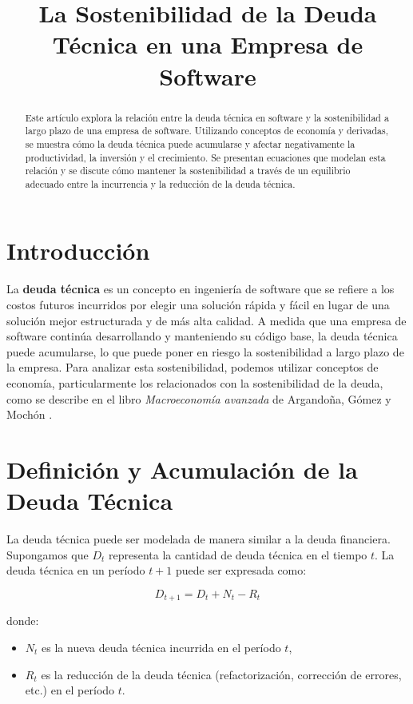 \documentclass[12pt]{article}
\title{La Sostenibilidad de la Deuda Técnica en una Empresa de Software}
\author{}
\date{}
\begin{document}
\maketitle

\tableofcontents %
\newpage %


\begin{abstract}
Este artículo explora la relación entre la deuda técnica en software y la sostenibilidad a largo plazo de una empresa de software. 
Utilizando conceptos de economía y derivadas, se muestra cómo la deuda técnica puede acumularse 
y afectar negativamente la productividad, la inversión y el crecimiento. 
Se presentan ecuaciones que modelan esta relación y se discute cómo mantener la sostenibilidad 
a través de un equilibrio adecuado entre la incurrencia y la reducción de la deuda técnica.
\end{abstract}

\section{Introducción}
La \textbf{deuda técnica} es un concepto en ingeniería de software que se refiere a los costos futuros incurridos por elegir una solución rápida y fácil en lugar de una solución mejor estructurada y de más alta calidad. A medida que una empresa de software continúa desarrollando y manteniendo su código base, la deuda técnica puede acumularse, lo que puede poner en riesgo la sostenibilidad a largo plazo de la empresa. Para analizar esta sostenibilidad, podemos utilizar conceptos de economía, particularmente los relacionados con la sostenibilidad de la deuda, como se describe en el libro \textit{Macroeconomía avanzada} de Argandoña, Gómez y Mochón \cite{Macroeconomía avanzada}.

\section{Definición y Acumulación de la Deuda Técnica}
La deuda técnica puede ser modelada de manera similar a la deuda financiera. Supongamos que \(D_t\) representa la cantidad de deuda técnica en el tiempo \(t\). La deuda técnica en un período \(t+1\) puede ser expresada como:

\[
D_{t+1} = D_t + N_t - R_t
\]

donde:
\begin{itemize}
    \item \(N_t\) es la nueva deuda técnica incurrida en el período \(t\),
    \item \(R_t\) es la reducción de la deuda técnica (refactorización, corrección de errores, etc.) en el período \(t\).
\end{itemize}
\end{document}
